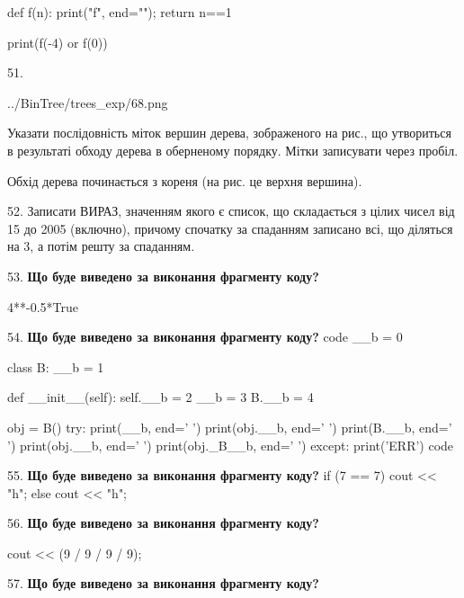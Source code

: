 \documentclass[11pt]{article}
\begin{document}
def f(n):
    print("f", end="");
    return n==1

print(f(-4) or f(0))
\par\vspace{5mm}
51. 

\begin{center}
	{../BinTree/trees_exp/68.png}
\end{center}
Указати послідовність міток вершин дерева, зображеного на рис., що утвориться в результаті обходу дерева в оберненому порядку. Мітки записувати через пробіл.\par Обхід дерева починається з кореня (на рис. це верхня вершина).
\par\vspace{5mm}
52. 
Записати ВИРАЗ, значенням якого є список, що складається з цілих чисел від 15 до 2005 (включно), причому спочатку за спаданням записано всі, що діляться на 3, а потім решту за спаданням.\par\vspace{5mm}
53. \textbf{Що буде виведено за виконання фрагменту коду?}

4**-0.5*True
\par\vspace{5mm}
54. \textbf{Що буде виведено за виконання фрагменту коду?}
code
__b = 0

class B:
    __b = 1
    
    def __init__(self):
        self.__b = 2
        __b = 3
        B.__b = 4

obj = B()
try:
    print(__b, end=' ')
    print(obj.__b, end=' ')
    print(B.__b, end=' ')
    print(obj.__b, end=' ')
    print(obj._B__b, end=' ')
except:
    print('ERR')
code
\par\vspace{5mm}
55. \textbf{Що буде виведено за виконання фрагменту коду?}
if (7 == 7)
    cout << "h";
else
    cout << "h";

\par\vspace{5mm}
56. \textbf{Що буде виведено за виконання фрагменту коду?}

cout << (9 / 9 / 9 / 9);
\par\vspace{5mm}
57. \textbf{Що буде виведено за виконання фрагменту коду?}
\end{document}
